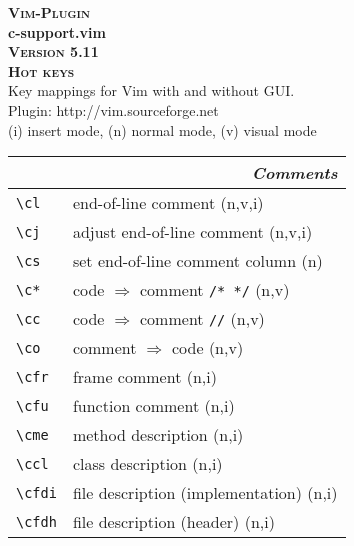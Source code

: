 \documentclass[oneside,11pt,landscape,DIV16]{scrartcl}
\newcommand{\Pluginversion}{5.11}
\begin{document}
%

\begin{multicols}{3}
%
\begin{center}
\textbf{\textsc{\small{Vim-Plugin}}}\\
\textbf{\LARGE{c-support.vim}}\\
\textbf{\textsc{\small{Version \Pluginversion}}}\\
\textbf{\textsc{\Huge{Hot keys}}}\\ 
Key mappings for Vim with and without GUI.\\
Plugin: http://vim.sourceforge.net\\
\vspace{3.0mm}
{\normalsize (i)} insert mode, {\normalsize (n)} normal mode, {\normalsize (v)} visual mode\\
\vspace{5.0mm}
%
\begin{tabular}[]{|p{10mm}|p{60mm}|}
%
\hline
\multicolumn{2}{|r|}{\textsl{\textbf{C}omments}} \\
\hline \verb'\cl'  & end-of-line comment                     \hfill (n,v,i)\\
\hline \verb'\cj'  & adjust end-of-line comment              \hfill (n,v,i)\\
\hline \verb'\cs'  & set end-of-line comment column          \hfill (n)    \\
\hline \verb'\c*'  & code $\Rightarrow$ comment \verb'/* */' \hfill (n,v)  \\
\hline \verb'\cc'  & code $\Rightarrow$ comment \verb'//'    \hfill (n,v)  \\
\hline \verb'\co'  & comment $\Rightarrow$ code              \hfill (n,v)  \\

\hline \verb'\cfr' & frame comment                           \hfill (n,i)\\
\hline \verb'\cfu' & function comment                        \hfill (n,i)\\
\hline \verb'\cme' & method description                      \hfill (n,i)\\
\hline \verb'\ccl' & class description                       \hfill (n,i)\\
\hline \verb'\cfdi'& file description (implementation)       \hfill (n,i)\\
\hline \verb'\cfdh'& file description (header)               \hfill (n,i)\\


\end{tabular}
\end{center}
\end{multicols}
\end{document}
